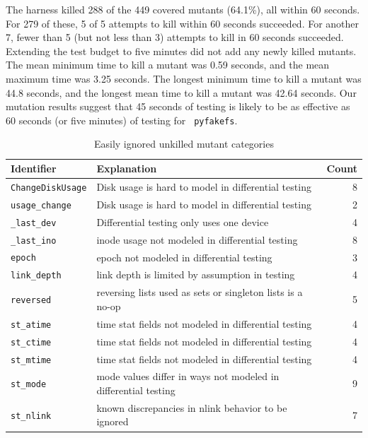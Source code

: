 \documentclass{svjour3}
\begin{document}
The harness killed 288 of the 449 covered mutants (64.1\%), all within 60
seconds.  For 279 of these, 5 of 5 attempts to kill within 60 seconds
succeeded.  For another 7, fewer than 5 (but not less than 3) attempts
to kill in 60 seconds succeeded.  Extending the test budget to five
minutes did not add any newly killed mutants.  The mean minimum time
to kill a mutant was 0.59 seconds, and the mean maximum time was 3.25
seconds.  The longest minimum time to kill a mutant was 44.8 seconds,
and the longest mean time to kill a mutant was 42.64 seconds.
Our mutation results suggest that 45 seconds of testing is likely to
be as effective as 60 seconds (or five minutes) of testing for {\tt
  pyfakefs}.

\begin{table}
\caption{Easily ignored unkilled mutant categories}
{%
\begin{tabular}{l|l|r}
Identifier & Explanation & Count \\
\hline
{\tt ChangeDiskUsage} & Disk usage is hard to model in differential
                        testing & 8 \\
{\tt usage\_change} & Disk usage is hard to model in differential
                      testing & 2 \\
{\tt \_last\_dev} & Differential testing only uses one device & 4\\
{\tt \_last\_ino} & inode usage not modeled in differential testing &
                                                                      8\\
{\tt epoch} & epoch not modeled in differential testing & 3\\
{\tt link\_depth} & link depth is limited by assumption in testing & 4\\
{\tt reversed} & reversing lists used as sets or singleton lists is a
                 no-op & 5\\
{\tt st\_atime} & time stat fields not modeled in differential testing
                         & 4 \\
{\tt st\_ctime} & time stat fields not modeled in differential testing
                         & 4\\
{\tt st\_mtime} & time stat fields not modeled in differential testing
                         & 4\\
{\tt st\_mode} & mode values differ in ways not modeled in
                 differential testing
                         & 9\\
{\tt st\_nlink} & known discrepancies in nlink behavior to be ignored
                         & 7\\
\end{tabular}
}
\label{table:ignore}
\end{table}
\end{document}
